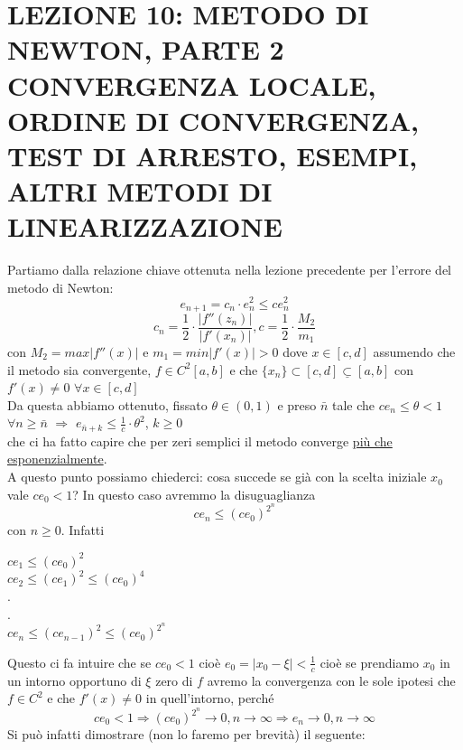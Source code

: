 \documentclass[12pt]{article}
\begin{document}
\section*{LEZIONE 10: METODO DI NEWTON, PARTE 2\\CONVERGENZA LOCALE, ORDINE DI CONVERGENZA, TEST DI ARRESTO, ESEMPI, ALTRI METODI DI LINEARIZZAZIONE}
Partiamo dalla relazione chiave ottenuta nella lezione precedente per l'errore del metodo di Newton:
\begin{equation*}
    e_{n+1}=c_n\cdot e_n^2 \leq  
    c e_n^2
\end{equation*}
\begin{equation}
    c_n=\frac{1}{2}\cdot \frac{|f''(z_n)|}{|f'(x_n)|},c=\frac{1}{2}\cdot\frac{M_2}{m_1}
\end{equation}
con $M_2=max|f''(x)|$ e $m_1=min|f'(x)|>0$ dove $x\in[c,d]$ assumendo che il metodo sia convergente, $f\in C^2[a,b]$ e che $\{ x_n\} \subset{[c,d]}\underline{\subset}{[a,b]}$ con $f'(x)\neq0$ $\forall x\in[c,d]$ \\ Da questa abbiamo ottenuto, fissato $\theta\in (0,1)$ e preso $\bar{n}$ tale che $ce_n\leq\theta<1$  $ \forall n\geq\bar{n}$  $ \Rightarrow$  $e_{\bar{n}+k}\leq\frac{1}{c}\cdot\theta^2$, $k\geq0$\\ che ci ha fatto capire che per zeri semplici il metodo converge \underline{più che esponenzialmente}.\\
A questo punto possiamo chiederci: cosa succede se già con la scelta iniziale $x_0$ vale $ce_0<1$? In questo caso avremmo la disuguaglianza 
\begin{equation*}
    ce_n\leq(ce_0)^{2^n}
\end{equation*}
con $n\geq0$. Infatti
\begin{center}
    $ce_1\leq(ce_0)^2$\\
    $ce_2\leq(ce_1)^2\leq(ce_0)^4$\\
    .\\
    .\\
    $ce_n\leq(ce_{n-1})^2\leq(ce_0)^{2^n}$
\end{center}
Questo ci fa intuire che se $ce_0<1$ cioè $e_0=|x_0-\xi|<\frac{1}{c}$ cioè se prendiamo $x_0$ in un intorno opportuno di $\xi$ zero di $f$ avremo la convergenza con le sole ipotesi che $f \in C^2$ e che $f'(x) \neq 0$ in quell'intorno, perché 
\begin{equation*}
    ce_0<1 \Rightarrow (ce_0)^{2^n} \to 0, n\to \infty \Rightarrow e_n \to 0, n \to \infty 
\end{equation*}
Si può infatti dimostrare (non lo faremo per brevità) il seguente: \\
\end{document}
